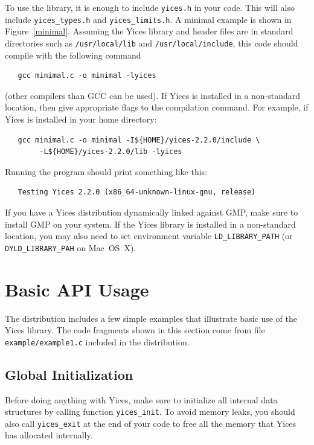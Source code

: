 \documentclass[11pt,twoside,fleqn,openright,titlepage]{cslreport}
\begin{document}
To use the library, it is enough to include \texttt{yices.h} in your
code. This will also include \texttt{yices\_types.h} and
\texttt{yices\_limits.h}. A minimal example is shown in
Figure~\ref{minimal}. Assuming the Yices library and header files are
in standard directories such as \texttt{/usr/local/lib} and
\texttt{/usr/local/include}, this code should compile with the
following command
\begin{small}
\begin{verbatim}
   gcc minimal.c -o minimal -lyices
\end{verbatim}
\end{small}
(other compilers than GCC can be used). If Yices is installed in a
non-standard location, then give appropriate flags to the compilation
command. For example, if Yices is installed in your home directory:
\begin{small}
\begin{verbatim}
   gcc minimal.c -o minimal -I${HOME}/yices-2.2.0/include \
        -L${HOME}/yices-2.2.0/lib -lyices
\end{verbatim}
\end{small}
Running the program should print something like this:
\begin{small}
\begin{verbatim}
   Testing Yices 2.2.0 (x86_64-unknown-linux-gnu, release)
\end{verbatim}
\end{small}
If you have a Yices distribution dynamically linked against GMP, make
sure to install GMP on your system.  If the Yices library is installed
in a non-standard location, you may also need to set environment
variable \texttt{LD\_LIBRARY\_PATH} (or \texttt{DYLD\_LIBRARY\_PAH} on
Mac~OS~X).


\section{Basic API Usage}

The distribution includes a few simple examples that illustrate basic
use of the Yices library. The code fragments shown in this section
come from file \texttt{example/example1.c} included in the
distribution.

\subsection*{Global Initialization}

Before doing anything with Yices, make sure to initialize all internal
data structures by calling function \texttt{yices\_init}.  To avoid
memory leaks, you should also call \texttt{yices\_exit} at the end of
your code to free all the memory that Yices has allocated internally.
\end{document}
